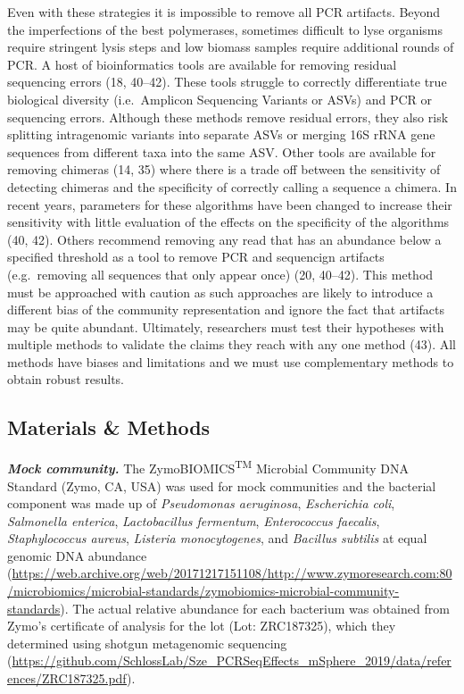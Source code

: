 \documentclass[11pt,]{article}
\begin{document}
Even with these strategies it is impossible to remove all PCR artifacts.
Beyond the imperfections of the best polymerases, sometimes difficult to
lyse organisms require stringent lysis steps and low biomass samples
require additional rounds of PCR. A host of bioinformatics tools are
available for removing residual sequencing errors (18, 40--42). These
tools struggle to correctly differentiate true biological diversity
(i.e.~Amplicon Sequencing Variants or ASVs) and PCR or sequencing
errors. Although these methods remove residual errors, they also risk
splitting intragenomic variants into separate ASVs or merging 16S rRNA
gene sequences from different taxa into the same ASV. Other tools are
available for removing chimeras (14, 35) where there is a trade off
between the sensitivity of detecting chimeras and the specificity of
correctly calling a sequence a chimera. In recent years, parameters for
these algorithms have been changed to increase their sensitivity with
little evaluation of the effects on the specificity of the algorithms
(40, 42). Others recommend removing any read that has an abundance below
a specified threshold as a tool to remove PCR and sequencign artifacts
(e.g.~removing all sequences that only appear once) (20, 40--42). This
method must be approached with caution as such approaches are likely to
introduce a different bias of the community representation and ignore
the fact that artifacts may be quite abundant. Ultimately, researchers
must test their hypotheses with multiple methods to validate the claims
they reach with any one method (43). All methods have biases and
limitations and we must use complementary methods to obtain robust
results.

\newpage

\hypertarget{materials-methods}{%
\subsection{Materials \& Methods}\label{materials-methods}}

\textbf{\emph{Mock community.}} The ZymoBIOMICS\textsuperscript{TM}
Microbial Community DNA Standard (Zymo, CA, USA) was used for mock
communities and the bacterial component was made up of \emph{Pseudomonas
aeruginosa}, \emph{Escherichia coli}, \emph{Salmonella enterica},
\emph{Lactobacillus fermentum}, \emph{Enterococcus faecalis},
\emph{Staphylococcus aureus}, \emph{Listeria monocytogenes}, and
\emph{Bacillus subtilis} at equal genomic DNA abundance
(\url{https://web.archive.org/web/20171217151108/http://www.zymoresearch.com:80/microbiomics/microbial-standards/zymobiomics-microbial-community-standards}).
The actual relative abundance for each bacterium was obtained from
Zymo's certificate of analysis for the lot (Lot: ZRC187325), which they
determined using shotgun metagenomic sequencing
(\url{https://github.com/SchlossLab/Sze_PCRSeqEffects_mSphere_2019/data/references/ZRC187325.pdf}).
\end{document}
